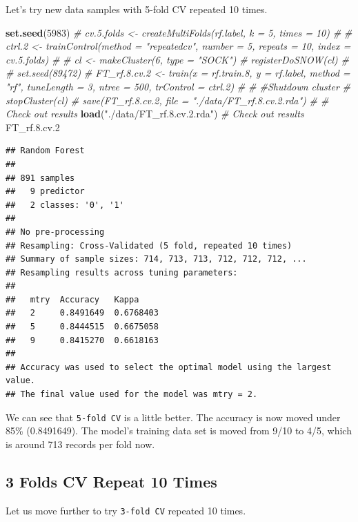 \documentclass[
]{book}
\newenvironment{Shaded}{\begin{snugshade}}{\end{snugshade}}
\newcommand{\CommentTok}[1]{\textcolor[rgb]{0.56,0.35,0.01}{\textit{#1}}}
\newcommand{\DecValTok}[1]{\textcolor[rgb]{0.00,0.00,0.81}{#1}}
\newcommand{\FloatTok}[1]{\textcolor[rgb]{0.00,0.00,0.81}{#1}}
\newcommand{\KeywordTok}[1]{\textcolor[rgb]{0.13,0.29,0.53}{\textbf{#1}}}
\newcommand{\NormalTok}[1]{#1}
\newcommand{\StringTok}[1]{\textcolor[rgb]{0.31,0.60,0.02}{#1}}
\begin{document}
Let's try new data samples with 5-fold CV repeated 10 times.

\begin{Shaded}
\begin{Highlighting}[]
\KeywordTok{set.seed}\NormalTok{(}\DecValTok{5983}\NormalTok{)}
\CommentTok{# cv.5.folds <- createMultiFolds(rf.label, k = 5, times = 10)}
\CommentTok{# }
\CommentTok{# ctrl.2 <- trainControl(method = "repeatedcv", number = 5, repeats = 10, index = cv.5.folds)}
\CommentTok{# }
\CommentTok{# cl <- makeCluster(6, type = "SOCK")}
\CommentTok{# registerDoSNOW(cl)}
\CommentTok{# }
\CommentTok{# set.seed(89472)}
\CommentTok{# FT_rf.8.cv.2 <- train(x = rf.train.8, y = rf.label, method = "rf", tuneLength = 3, ntree = 500, trControl = ctrl.2)}
\CommentTok{# }
\CommentTok{# #Shutdown cluster}
\CommentTok{# stopCluster(cl)}
\CommentTok{# save(FT_rf.8.cv.2, file = "./data/FT_rf.8.cv.2.rda")}
\CommentTok{# # Check out results}
\KeywordTok{load}\NormalTok{(}\StringTok{"./data/FT_rf.8.cv.2.rda"}\NormalTok{)}
\CommentTok{# Check out results}
\NormalTok{FT_rf.}\FloatTok{8.}\NormalTok{cv}\FloatTok{.2} 
\end{Highlighting}
\end{Shaded}

\begin{verbatim}
## Random Forest 
## 
## 891 samples
##   9 predictor
##   2 classes: '0', '1' 
## 
## No pre-processing
## Resampling: Cross-Validated (5 fold, repeated 10 times) 
## Summary of sample sizes: 714, 713, 713, 712, 712, 712, ... 
## Resampling results across tuning parameters:
## 
##   mtry  Accuracy   Kappa    
##   2     0.8491649  0.6768403
##   5     0.8444515  0.6675058
##   9     0.8415270  0.6618163
## 
## Accuracy was used to select the optimal model using the largest value.
## The final value used for the model was mtry = 2.
\end{verbatim}

We can see that \texttt{5-fold\ CV} is a little better. The accuracy is now moved under 85\% (0.8491649). The model's training data set is moved from 9/10 to 4/5, which is around 713 records per fold now.

\hypertarget{folds-cv-repeat-10-times-2}{%
\subsection*{3 Folds CV Repeat 10 Times}\label{folds-cv-repeat-10-times-2}}


Let us move further to try \texttt{3-fold\ CV} repeated 10 times.
\end{document}
